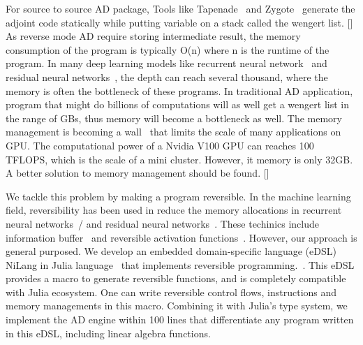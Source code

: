 \documentclass[aps,twocolumn,longbibliography,english,superscriptaddress]{revtex4-1}
\newcommand{\<}{\langle}
\renewcommand{\>}{\rangle}
\newcommand{\blue}[1]{[{\bf  \color{blue}{JG: #1}}]}
\theoremstyle{definition}\newtheorem{definition}{\textit{Definition}}
\begin{document}
    For source to source AD package, Tools like Tapenade~\cite{Hascoet2013} and Zygote~\cite{Innes2018, Innes2019} generate the adjoint code statically while putting variable on a stack called the wengert list. \blue{The introduction to source to source AD is a bit weak, please give reader an overview about the development and difficulty in this field.}
    As reverse mode AD require storing intermediate result, the memory consumption of the program is typically O(n) where n is the runtime of the program. In many deep learning models like recurrent neural network~\cite{Lipton2015} and residual neural networks~\cite{He2016}, the depth can reach several thousand, where the memory is often the bottleneck of these programs. In traditional AD application, program that might do billions of computations will as well get a wengert list in the range of GBs, thus memory will become a bottleneck as well.
The memory management is becoming a wall~\cite{Luo2019} that limits the scale of many applications on GPU. The computational power of a Nvidia V100 GPU can reaches 100 TFLOPS, which is the scale of a mini cluster. However, it memory is only 32GB. A better solution to memory management should be found.
    \blue{@MLS, Do you have any good comments about starving CPU, i.e. memory accessing is consuming much more time than computing itself.
    This is why caching intermediate result is a performance killer.}



    We tackle this problem by making a program reversible. In the machine learning field, reversibility has been used in reduce the memory allocations in recurrent neural networks~/\cite{MacKay2018} and residual neural networks~\cite{Behrmann2018}. These techinics include information buffer~\cite{Maclaurin2015} and reversible activation functions~\cite{Gomez2017,Jacobsen2018}. However, our approach is general purposed. We develop an embedded domain-specific language (eDSL) NiLang in Julia language~\cite{Bezanson2012,Bezanson2017} that implements reversible programming.~\cite{Perumalla2013,Frank2017}.
    This eDSL provides a macro to generate reversible functions, and is completely compatible with Julia ecosystem. One can write reversible control flows, instructions and memory managements in this macro. Combining it with Julia's type system, we implement the AD engine within 100 lines that differentiate any program written in this eDSL, including linear algebra functions.
\end{document}
